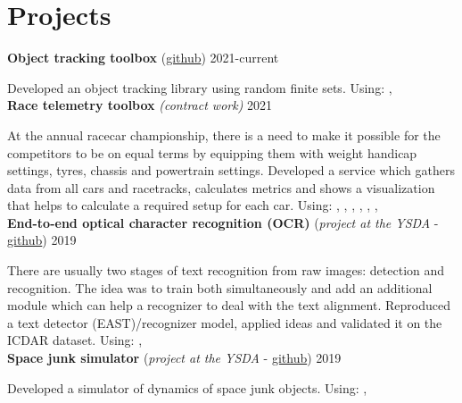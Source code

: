 \section*{\sectionformat Projects}
\textbf{Object tracking toolbox} (\href{https://github.com/neer201/Multi-Object-Tracking-for-Automotive-Systems-in-python}{github}) \hfill 2021-current
\par
Developed an object tracking library using random finite sets.
Using: , 
\\
% 
\textbf{Race telemetry toolbox} \textit{(contract work)} \hfill 2021
\par
At the annual racecar championship, there is a need to make it possible for the competitors to be on equal terms by equipping them with weight handicap settings, tyres, chassis and powertrain settings.
Developed a service which gathers data from all cars and racetracks, calculates metrics and shows a visualization that helps to calculate a required setup for each car.
Using: , , , , , , 
\\
\textbf{End-to-end optical character recognition (OCR)} (\textit{project at the YSDA} - \href{https://github.com/neer201/end2end_OCR}{github})  \hfill 2019
\par
There are usually two stages of text recognition from raw images: detection and recognition. The idea was to train both simultaneously and add an additional module which can help a recognizer to deal with the text alignment. Reproduced a text detector (EAST)/recognizer model, applied ideas and validated it on the ICDAR dataset.
Using: , 
% 
\\
\textbf{Space junk simulator} (\textit{project at the YSDA} - \href{https://github.com/neer201/space_junk_simulator}{github})   \hfill 2019
\par
Developed a simulator of dynamics of space junk objects.
Using: , 
